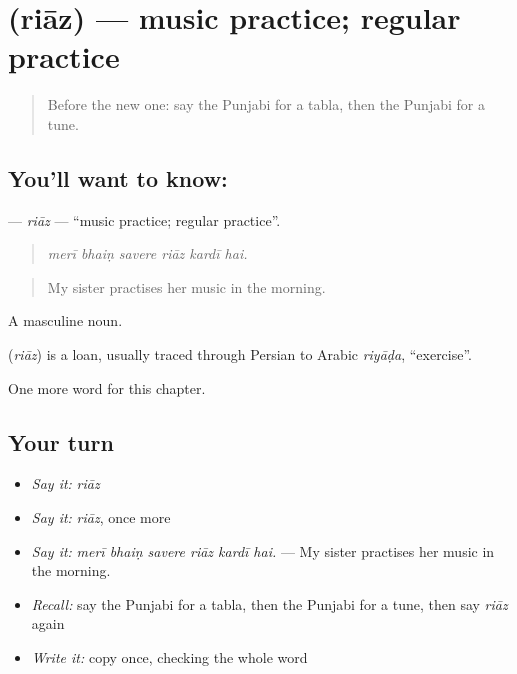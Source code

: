 \section[\texorpdfstring{\pa{ਰਿਆਜ਼} (riāz)}{ਰਿਆਜ਼ (riāz)}]{ (riāz) — music practice; regular practice}

\label{lesson:PA-C348-riaz}



\begin{quote}
Before the new one: say the Punjabi for a tabla, then the Punjabi for a tune.
\end{quote}

\subsection*{You'll want to know: }
\textbf{} — \emph{riāz} — \textquotedblleft{}music practice; regular practice\textquotedblright{}.

\begin{quote}
     
\end{quote}

\begin{quote}
\emph{merī bhaiṇ savere riāz kardī hai.}
\end{quote}

\begin{quote}
My sister practises her music in the morning.
\end{quote}

A masculine noun.

\begin{cousinweb}
\textbf{} (\emph{riāz}) is a loan, usually traced through Persian to Arabic \emph{riyāḍa}, \textquotedblleft{}exercise\textquotedblright{}.
\end{cousinweb}

\begin{grammarlens}[title={What you've built}]
One more word for this chapter.
\end{grammarlens}

\subsection*{Your turn}
\begin{itemize}
\raggedright
  \item \emph{Say it:} \emph{riāz}
  \item \emph{Say it:} \emph{riāz}, once more
  \item \emph{Say it:} \emph{merī bhaiṇ savere riāz kardī hai.} — My sister practises her music in the morning.
  \item \emph{Recall:} say the Punjabi for a tabla, then the Punjabi for a tune, then say \emph{riāz} again
  \item \emph{Write it:} copy \textbf{} once, checking the whole word
\end{itemize}


